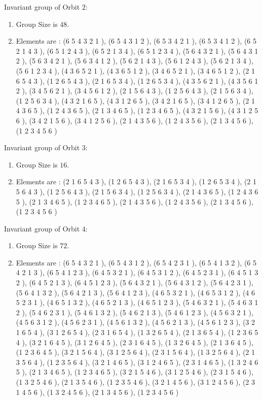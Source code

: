 \documentclass[12pt]{article}
\begin{document}
Invariant group of Orbit $2$:
\begin{enumerate}
\item Group Size is $48$.
\item Elements are : (6 5 4 3 2 1  ), (6 5 4 3 1 2  ), (6 5 3 4 2 1  ), (6 5 3 4 1 2  ), (6 5 2 1 4 3  ), (6 5 1 2 4 3  ), (6 5 2 1 3 4  ), (6 5 1 2 3 4  ), (5 6 4 3 2 1  ), (5 6 4 3 1 2  ), (5 6 3 4 2 1  ), (5 6 3 4 1 2  ), (5 6 2 1 4 3  ), (5 6 1 2 4 3  ), (5 6 2 1 3 4  ), (5 6 1 2 3 4  ), (4 3 6 5 2 1  ), (4 3 6 5 1 2  ), (3 4 6 5 2 1  ), (3 4 6 5 1 2  ), (2 1 6 5 4 3  ), (1 2 6 5 4 3  ), (2 1 6 5 3 4  ), (1 2 6 5 3 4  ), (4 3 5 6 2 1  ), (4 3 5 6 1 2  ), (3 4 5 6 2 1  ), (3 4 5 6 1 2  ), (2 1 5 6 4 3  ), (1 2 5 6 4 3  ), (2 1 5 6 3 4  ), (1 2 5 6 3 4  ), (4 3 2 1 6 5  ), (4 3 1 2 6 5  ), (3 4 2 1 6 5  ), (3 4 1 2 6 5  ), (2 1 4 3 6 5  ), (1 2 4 3 6 5  ), (2 1 3 4 6 5  ), (1 2 3 4 6 5  ), (4 3 2 1 5 6  ), (4 3 1 2 5 6  ), (3 4 2 1 5 6  ), (3 4 1 2 5 6  ), (2 1 4 3 5 6  ), (1 2 4 3 5 6  ), (2 1 3 4 5 6  ), (1 2 3 4 5 6  )
\end{enumerate}
Invariant group of Orbit $3$:
\begin{enumerate}
\item Group Size is $16$.
\item Elements are : (2 1 6 5 4 3  ), (1 2 6 5 4 3  ), (2 1 6 5 3 4  ), (1 2 6 5 3 4  ), (2 1 5 6 4 3  ), (1 2 5 6 4 3  ), (2 1 5 6 3 4  ), (1 2 5 6 3 4  ), (2 1 4 3 6 5  ), (1 2 4 3 6 5  ), (2 1 3 4 6 5  ), (1 2 3 4 6 5  ), (2 1 4 3 5 6  ), (1 2 4 3 5 6  ), (2 1 3 4 5 6  ), (1 2 3 4 5 6  )
\end{enumerate}
Invariant group of Orbit $4$:
\begin{enumerate}
\item Group Size is $72$.
\item Elements are : (6 5 4 3 2 1  ), (6 5 4 3 1 2  ), (6 5 4 2 3 1  ), (6 5 4 1 3 2  ), (6 5 4 2 1 3  ), (6 5 4 1 2 3  ), (6 4 5 3 2 1  ), (6 4 5 3 1 2  ), (6 4 5 2 3 1  ), (6 4 5 1 3 2  ), (6 4 5 2 1 3  ), (6 4 5 1 2 3  ), (5 6 4 3 2 1  ), (5 6 4 3 1 2  ), (5 6 4 2 3 1  ), (5 6 4 1 3 2  ), (5 6 4 2 1 3  ), (5 6 4 1 2 3  ), (4 6 5 3 2 1  ), (4 6 5 3 1 2  ), (4 6 5 2 3 1  ), (4 6 5 1 3 2  ), (4 6 5 2 1 3  ), (4 6 5 1 2 3  ), (5 4 6 3 2 1  ), (5 4 6 3 1 2  ), (5 4 6 2 3 1  ), (5 4 6 1 3 2  ), (5 4 6 2 1 3  ), (5 4 6 1 2 3  ), (4 5 6 3 2 1  ), (4 5 6 3 1 2  ), (4 5 6 2 3 1  ), (4 5 6 1 3 2  ), (4 5 6 2 1 3  ), (4 5 6 1 2 3  ), (3 2 1 6 5 4  ), (3 1 2 6 5 4  ), (2 3 1 6 5 4  ), (1 3 2 6 5 4  ), (2 1 3 6 5 4  ), (1 2 3 6 5 4  ), (3 2 1 6 4 5  ), (3 1 2 6 4 5  ), (2 3 1 6 4 5  ), (1 3 2 6 4 5  ), (2 1 3 6 4 5  ), (1 2 3 6 4 5  ), (3 2 1 5 6 4  ), (3 1 2 5 6 4  ), (2 3 1 5 6 4  ), (1 3 2 5 6 4  ), (2 1 3 5 6 4  ), (1 2 3 5 6 4  ), (3 2 1 4 6 5  ), (3 1 2 4 6 5  ), (2 3 1 4 6 5  ), (1 3 2 4 6 5  ), (2 1 3 4 6 5  ), (1 2 3 4 6 5  ), (3 2 1 5 4 6  ), (3 1 2 5 4 6  ), (2 3 1 5 4 6  ), (1 3 2 5 4 6  ), (2 1 3 5 4 6  ), (1 2 3 5 4 6  ), (3 2 1 4 5 6  ), (3 1 2 4 5 6  ), (2 3 1 4 5 6  ), (1 3 2 4 5 6  ), (2 1 3 4 5 6  ), (1 2 3 4 5 6  )
\end{enumerate}
\end{document}
